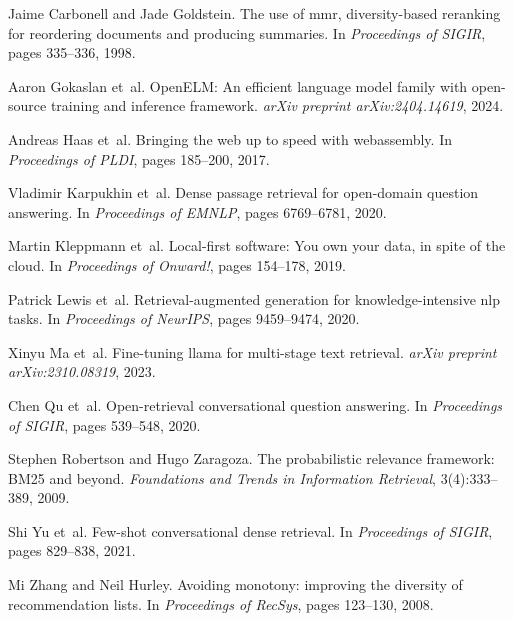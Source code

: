 \documentclass[letterpaper]{article}
\begin{document}

\begin{thebibliography}{99}

Jaime Carbonell and Jade Goldstein.
\newblock The use of mmr, diversity-based reranking for reordering documents and producing summaries.
\newblock In \emph{Proceedings of SIGIR}, pages 335--336, 1998.

Aaron Gokaslan et~al.
\newblock OpenELM: An efficient language model family with open-source training and inference framework.
\newblock \emph{arXiv preprint arXiv:2404.14619}, 2024.

Andreas Haas et~al.
\newblock Bringing the web up to speed with webassembly.
\newblock In \emph{Proceedings of PLDI}, pages 185--200, 2017.

Vladimir Karpukhin et~al.
\newblock Dense passage retrieval for open-domain question answering.
\newblock In \emph{Proceedings of EMNLP}, pages 6769--6781, 2020.

Martin Kleppmann et~al.
\newblock Local-first software: You own your data, in spite of the cloud.
\newblock In \emph{Proceedings of Onward!}, pages 154--178, 2019.

Patrick Lewis et~al.
\newblock Retrieval-augmented generation for knowledge-intensive nlp tasks.
\newblock In \emph{Proceedings of NeurIPS}, pages 9459--9474, 2020.

Xinyu Ma et~al.
\newblock Fine-tuning llama for multi-stage text retrieval.
\newblock \emph{arXiv preprint arXiv:2310.08319}, 2023.

Chen Qu et~al.
\newblock Open-retrieval conversational question answering.
\newblock In \emph{Proceedings of SIGIR}, pages 539--548, 2020.

Stephen Robertson and Hugo Zaragoza.
\newblock The probabilistic relevance framework: BM25 and beyond.
\newblock \emph{Foundations and Trends in Information Retrieval}, 3(4):333--389, 2009.

Shi Yu et~al.
\newblock Few-shot conversational dense retrieval.
\newblock In \emph{Proceedings of SIGIR}, pages 829--838, 2021.

Mi Zhang and Neil Hurley.
\newblock Avoiding monotony: improving the diversity of recommendation lists.
\newblock In \emph{Proceedings of RecSys}, pages 123--130, 2008.

\end{thebibliography}
\end{document}
